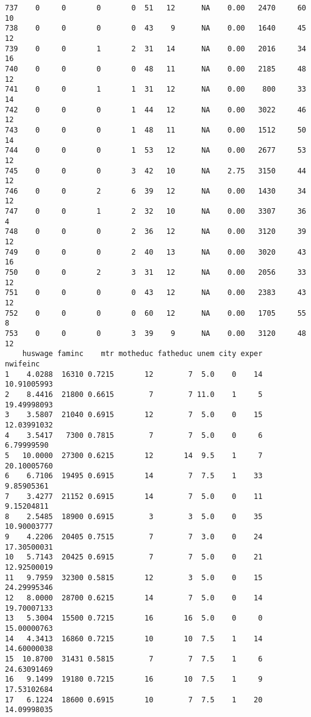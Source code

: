 \documentclass[
  letterpaper,
  DIV=11,
  numbers=noendperiod]{scrreprt}
\begin{document}
\begin{verbatim}
737    0     0       0       0  51   12      NA    0.00   2470     60      10
738    0     0       0       0  43    9      NA    0.00   1640     45      12
739    0     0       1       2  31   14      NA    0.00   2016     34      16
740    0     0       0       0  48   11      NA    0.00   2185     48      12
741    0     0       1       1  31   12      NA    0.00    800     33      14
742    0     0       0       1  44   12      NA    0.00   3022     46      12
743    0     0       0       1  48   11      NA    0.00   1512     50      14
744    0     0       0       1  53   12      NA    0.00   2677     53      12
745    0     0       0       3  42   10      NA    2.75   3150     44      12
746    0     0       2       6  39   12      NA    0.00   1430     34      12
747    0     0       1       2  32   10      NA    0.00   3307     36       4
748    0     0       0       2  36   12      NA    0.00   3120     39      12
749    0     0       0       2  40   13      NA    0.00   3020     43      16
750    0     0       2       3  31   12      NA    0.00   2056     33      12
751    0     0       0       0  43   12      NA    0.00   2383     43      12
752    0     0       0       0  60   12      NA    0.00   1705     55       8
753    0     0       0       3  39    9      NA    0.00   3120     48      12
    huswage faminc    mtr motheduc fatheduc unem city exper    nwifeinc
1    4.0288  16310 0.7215       12        7  5.0    0    14 10.91005993
2    8.4416  21800 0.6615        7        7 11.0    1     5 19.49998093
3    3.5807  21040 0.6915       12        7  5.0    0    15 12.03991032
4    3.5417   7300 0.7815        7        7  5.0    0     6  6.79999590
5   10.0000  27300 0.6215       12       14  9.5    1     7 20.10005760
6    6.7106  19495 0.6915       14        7  7.5    1    33  9.85905361
7    3.4277  21152 0.6915       14        7  5.0    0    11  9.15204811
8    2.5485  18900 0.6915        3        3  5.0    0    35 10.90003777
9    4.2206  20405 0.7515        7        7  3.0    0    24 17.30500031
10   5.7143  20425 0.6915        7        7  5.0    0    21 12.92500019
11   9.7959  32300 0.5815       12        3  5.0    0    15 24.29995346
12   8.0000  28700 0.6215       14        7  5.0    0    14 19.70007133
13   5.3004  15500 0.7215       16       16  5.0    0     0 15.00000763
14   4.3413  16860 0.7215       10       10  7.5    1    14 14.60000038
15  10.8700  31431 0.5815        7        7  7.5    1     6 24.63091469
16   9.1499  19180 0.7215       16       10  7.5    1     9 17.53102684
17   6.1224  18600 0.6915       10        7  7.5    1    20 14.09998035

\end{verbatim}
\end{document}
